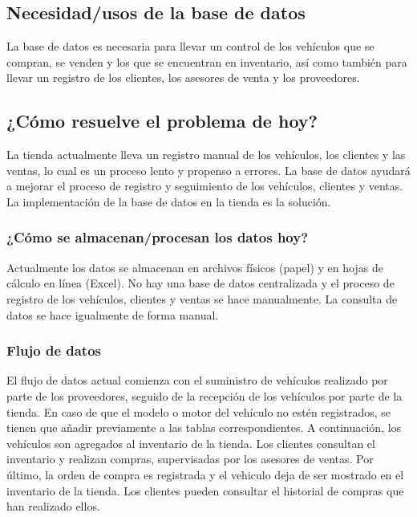 \documentclass[12pt]{article}
\begin{document}
\subsection{Necesidad/usos de la base de datos}

La base de datos es necesaria para llevar un control de los vehículos que se compran, se venden y los que se encuentran en inventario, así como también para llevar un registro de los clientes, los asesores de venta y los proveedores.

\subsection{¿Cómo resuelve el problema de hoy?}

La tienda actualmente lleva un registro manual de los vehículos, los clientes y las ventas, lo cual es un proceso lento y propenso a errores. La base de datos ayudará a mejorar el proceso de registro y seguimiento de los vehículos, clientes y ventas. La implementación de la base de datos en la tienda es la solución.

\subsubsection{¿Cómo se almacenan/procesan los datos hoy?}

Actualmente los datos se almacenan en archivos físicos (papel) y en hojas de cálculo en línea (Excel). No hay una base de datos centralizada y el proceso de registro de los vehículos, clientes y ventas se hace manualmente. La consulta de datos se hace igualmente de forma manual.

\subsubsection{Flujo de datos}

El flujo de datos actual comienza con el suministro de vehículos realizado por parte de los proveedores, seguido de la recepción de los vehículos por parte de la tienda. En caso de que el modelo o motor del vehículo no estén registrados, se tienen que añadir previamente a las tablas correspondientes. A continuación, los vehículos son agregados al inventario de la tienda. Los clientes consultan el inventario y realizan compras, supervisadas por los asesores de ventas. Por último, la orden de compra es registrada y el vehiculo deja de ser mostrado en el inventario de la tienda. Los clientes pueden consultar el historial de compras que han realizado ellos.
\end{document}
